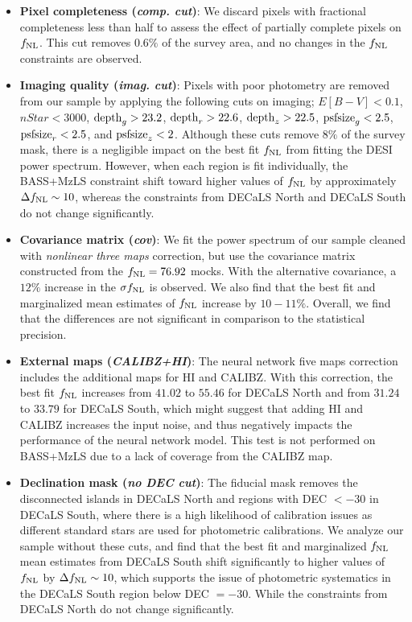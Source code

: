 \begin{itemize}[itemindent=*]
\item \textbf{Pixel completeness (\textit{comp. cut})}: We discard pixels with fractional completeness less than half to assess the effect of partially complete pixels on $f_{\rm NL}$. This cut removes $0.6\%$ of the survey area, and no changes in the $f_{\rm NL}$ constraints are observed.

\item \textbf{Imaging quality (\textit{imag. cut})}: Pixels with poor photometry are removed from our sample by applying the following cuts on imaging; $E[B-V]<0.1$, $nStar < 3000$, ${\rm depth}_{g} > 23.2$, ${\rm depth}_{r} > 22.6$, ${\rm depth}_{z} > 22.5$, ${\rm psfsize}_{g}<2.5$, ${\rm psfsize}_{r}<2.5$, and ${\rm psfsize}_{z}<2$. Although these cuts remove $8\%$ of the survey mask, there is a negligible impact on the best fit $f_{\rm NL}$ from fitting the DESI power spectrum. However, when each region is fit individually, the BASS+MzLS constraint shift toward higher values of $f_{\rm NL}$ by approximately $\Delta f_{\rm NL} \sim 10$, whereas the constraints from DECaLS North and DECaLS South do not change significantly. 

\item \textbf{Covariance matrix (\textit{cov})}: We fit the power spectrum of our sample cleaned with \textit{nonlinear three maps} correction, but use the covariance matrix constructed from the $f_{\rm NL}=76.92$ mocks. With the alternative covariance, a $12\%$ increase in the $\sigma f_{\rm NL}$ is observed. We also find that the best fit and marginalized mean estimates of $f_{\rm NL}$ increase by $10-11\%$. Overall, we find that the differences are not significant in comparison to the statistical precision.

\item \textbf{External maps (\textit{CALIBZ+HI})}: The neural network five maps correction includes the additional maps for HI and CALIBZ. With this correction, the best fit $f_{\rm NL}$ increases from $41.02$ to $55.46$ for DECaLS North and from $31.24$ to $33.79$ for DECaLS South, which might suggest that adding HI and CALIBZ increases the input noise, and thus negatively impacts the performance of the neural network model. This test is not performed on BASS+MzLS due to a lack of coverage from the CALIBZ map. 

\item \textbf{Declination mask (\textit{no DEC cut})}: The fiducial mask removes the disconnected islands in DECaLS North and regions with DEC $<-30$ in DECaLS South, where there is a high likelihood of calibration issues as different standard stars are used for photometric calibrations. We analyze our sample without these cuts, and find that the best fit and marginalized $f_{\rm NL}$ mean estimates from DECaLS South shift significantly to higher values of $f_{\rm NL}$ by $\Delta f_{\rm NL} \sim 10$, which supports the issue of photometric systematics in the DECaLS South region below DEC $=-30$. While the constraints from DECaLS North do not change significantly. 


\end{itemize}
